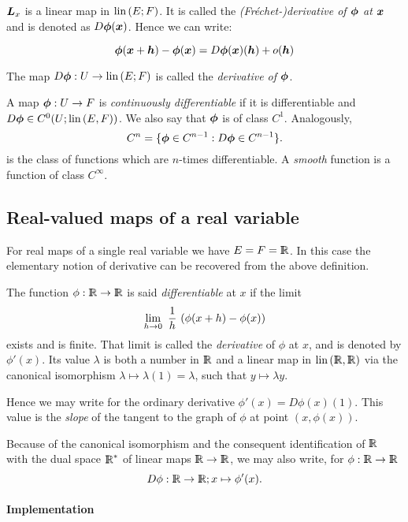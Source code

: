 \documentclass{31x47jw}
\begin{document}
${\mbox{\boldmath $L$}}_{x}$ is a linear map in $\mbox{\rm lin}\,(E;F)$.  It is called the
\emph{(Fr\'echet-)derivative of ${\mbox{\boldmath $\phi$}}$ at ${\mbox{\boldmath $x$}}$} and is denoted as 
$D{\mbox{\boldmath $\phi$}}({\mbox{\boldmath $x$}})$. 
Hence we can write:

    \[
    {\mbox{\boldmath $\phi$}}({\mbox{\boldmath $x$}}+{\mbox{\boldmath $h$}}) - {\mbox{\boldmath $\phi$}}({\mbox{\boldmath $x$}}) = D{\mbox{\boldmath $\phi$}}({\mbox{\boldmath $x$}})({\mbox{\boldmath $h$}}) + o({\mbox{\boldmath $h$}})
    \]

The map $D{\mbox{\boldmath $\phi$}}: U \rightarrow \mbox{\rm lin}\,(E;F)$ is called the
\emph{derivative of ${\mbox{\boldmath $\phi$}}$}.

A map ${\mbox{\boldmath $\phi$}}: U\rightarrow F$ is \emph{continuously differentiable} if it
is differentiable and $D{\mbox{\boldmath $\phi$}} \in C^{0}(U;\mbox{\rm lin}\,(E,F))$.  We also say that
${\mbox{\boldmath $\phi$}}$ is of class $C^{1}$.  Analogously, 
\[
C^{n} = \{ {\mbox{\boldmath $\phi$}}\in C^{n-1}: D{\mbox{\boldmath $\phi$}} \in C^{n-1} \}.
\]
is the class of functions which are $n$-times differentiable.  A
\emph{smooth} function is a function of class $C^{\infty}$.
    
\subsection{Real-valued maps of a real variable}

For real maps of a single real variable we have $E = F = \mathbb{I\!\!R}$.  In this
case the elementary notion of derivative can be recovered from the
above definition.

The function $\phi : \mathbb{I\!\!R} \rightarrow \mathbb{I\!\!R}$ is said \emph{differentiable} at $x$
if the limit
\[
\lim_{h \rightarrow 0}\ {1\over h}\ (\phi(x+h) - \phi(x))
\]
exists and is finite.  
That limit is called the \emph{derivative} of $\phi$ at $x$, and is
denoted by $\phi'(x)$.  Its value $\lambda$ is both a number in $\mathbb{I\!\!R}$ and
a linear map in $\mbox{\rm lin}\,(\mathbb{I\!\!R},\mathbb{I\!\!R})$ via the canonical isomorphism
$\lambda\mapsto\lambda(1)=\lambda$, such that $y\mapsto \lambda y$.

Hence we may write for the ordinary derivative $\phi'(x) = D\phi(x)(1)$.  This
value is the \emph{slope} of the tangent to the graph of $\phi$ at point
$(x,\phi(x))$.


Because of the canonical isomorphism and the consequent identification
of $\mathbb{I\!\!R}$ with the dual space $\mathbb{I\!\!R}^{*}$  of linear maps
$\mathbb{I\!\!R}\rightarrow\mathbb{I\!\!R}$, we may also write, for $\phi:\mathbb{I\!\!R}\rightarrow\mathbb{I\!\!R}$
\[
D\phi:\mathbb{I\!\!R}\rightarrow\mathbb{I\!\!R}; x \mapsto \phi'(x).
\]


\paragraph{Implementation}
\end{document}
